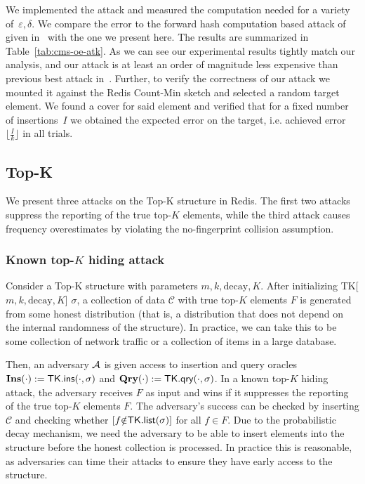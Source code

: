 We implemented the attack and measured the computation needed for a variety of~$\varepsilon, \delta$. We compare the error to the forward hash computation based attack of~\cite{markelon23} given in~ with the one we present here. The results are summarized in Table~\ref{tab:cms-oe-atk}. As we can see our experimental results tightly match our analysis, and our attack is at least an order of magnitude less expensive than previous best attack in~\cite{markelon23}. Further, to verify the correctness of our attack we mounted it against the Redis Count-Min sketch and selected a random target element. We found a cover for said element and verified that for a fixed number of insertions~$I$ we obtained the expected error on the target, i.e. achieved error~$\lfloor \frac{I}{k}  \rfloor$ in all trials. 

\subsection{Top-K}\label{attacks:tk}

We present three attacks on the Top-K structure in Redis. 
The first two attacks suppress the reporting of the true top-$K$ elements, while the third attack causes frequency overestimates by violating the no-fingerprint collision assumption.

\subsubsection{Known top-$K$ hiding attack}
\label{sec:known-top-k-hiding}

Consider a Top-K structure with parameters $m, k, \mathrm{decay}, K$. After initializing TK[$m, k, \mathrm{decay}, K$] $\sigma$, a collection of data $\mathcal{C}$ with true top-$K$ elements $F$ is generated from some honest distribution (that is, a distribution that does not depend on the internal randomness of the structure). In practice, we can take this to be some collection of network traffic or a collection of items in a large database. 

Then, an adversary $\mathcal{A}$ is given access to insertion and query oracles $\textbf{Ins}(\cdot) := \textsf{TK}.\textsf{ins}(\cdot, \sigma)$ and $\textbf{Qry}(\cdot) := \textsf{TK}.\textsf{qry}(\cdot, \sigma)$. In a known top-$K$ hiding attack, the adversary receives $F$ as input and wins if it suppresses the reporting of the true top-$K$ elements $F$. The adversary's success can be checked by inserting $\mathcal{C}$ and checking whether $[f {\notin} \textsf{TK}.\textsf{list}(\sigma)]$ for all $f \in F$. Due to the probabilistic decay mechanism, we need the adversary to be able to insert elements into the structure before the honest collection is processed. In practice this is reasonable, as adversaries can time their attacks to ensure  they have early access to the structure.


